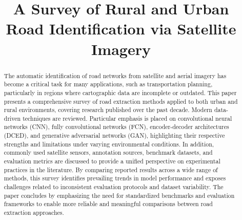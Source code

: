 \documentclass[conference]{IEEEtran}
\begin{document}


\title{A Survey of Rural and Urban Road Identification via Satellite Imagery}

\author{
    \and
}

\maketitle

\begin{abstract}
    The automatic identification of road networks from satellite and aerial imagery has become a critical task for many applications, such as transportation planning, particularly in regions where cartographic data are incomplete or outdated. This paper presents a comprehensive survey of road extraction methods applied to both urban and rural environments, covering research published over the past decade. Modern data-driven techniques are reviewed. Particular emphasis is placed on convolutional neural networks (CNN), fully convolutional networks (FCN), encoder-decoder architectures (DCED), and generative adversarial networks (GAN), highlighting their respective strengths and limitations under varying environmental conditions. In addition, commonly used satellite sensors, annotation sources, benchmark datasets, and evaluation metrics are discussed to provide a unified perspective on experimental practices in the literature. By comparing reported results across a wide range of methods, this survey identifies prevailing trends in model performance and exposes challenges related to inconsistent evaluation protocols and dataset variability. The paper concludes by emphasizing the need for standardized benchmarks and evaluation frameworks to enable more reliable and meaningful comparisons between road extraction approaches.
\end{abstract}
\end{document}
